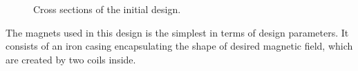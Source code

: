 \documentclass{article}
\begin{document}
\vspace{20pt}
\begin{figure}[H]
    \centering
    \qquad{}%
    \vspace{0pt}
    \caption{\centering Cross sections of the initial design.} 
    \label{fig:initial_design_cross_section}
    \vspace{-12pt}
\end{figure}
The magnets used in this design is the simplest in terms of design parameters. It consists of an iron casing encapsulating the shape of desired magnetic field, which are created by two coils inside.
\end{document}
